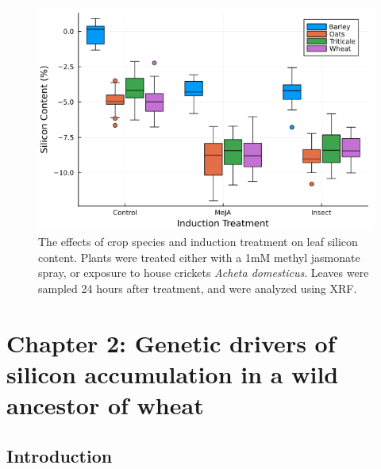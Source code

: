 \documentclass[12pt, letterpaper, ]{article}
\begin{document}
\begin{figure}[h]
        \includegraphics[width = \textwidth]{images/induction_plot.png}
        \centering
        \caption{The effects of crop species and induction treatment on leaf silicon content. Plants were treated either with a 1mM methyl jasmonate spray, or exposure to house crickets \textit{Acheta domesticus}. Leaves were sampled 24 hours after treatment, and were analyzed using XRF.}
\end{figure}

\clearpage



\section{Chapter 2: Genetic drivers of silicon accumulation in a wild ancestor of wheat}

\subsection{Introduction}
\end{document}
